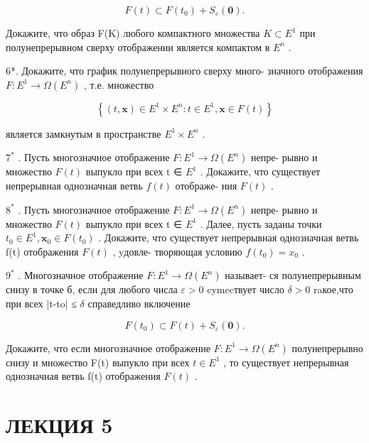 \documentclass[8pt]{extarticle}
\begin{document}
\[
F\left( t\right)  \subset  F\left( {t}_{0}\right)  + {S}_{\varepsilon }\left( \mathbf{0}\right) .
\]

Докажите, что образ F(K) любого компактного множества \(K \subset  {E}^{1}\) при полунепрерывном сверху отображении является компактом в \({E}^{n}\) .

6*. Докажите, что график полунепрерывного сверху много- значного отображения \(F : {E}^{1} \rightarrow  \Omega \left( {E}^{n}\right)\) , т.е. множество

\[
\left\{  {\left( {t,\mathbf{x}}\right)  \in  {E}^{1} \times  {E}^{n} : t \in  {E}^{1},\mathbf{x} \in  F\left( t\right) }\right\}
\]

является замкнутым в пространстве \({E}^{1} \times  {E}^{n}\) .

\({7}^{ * }\) . Пусть многозначное отображение \(F : {E}^{1} \rightarrow  \Omega \left( {E}^{n}\right)\) непре- рывно и множество \(F\left( t\right)\) выпукло при всех t ∈ \({E}^{1}\) . Докажите, что существует непрерывная однозначная ветвь \(f\left( t\right)\) отображе- ния \(F\left( t\right)\) .

\({8}^{ * }\) . Пусть многозначное отображение \(F : {E}^{1} \rightarrow  \Omega \left( {E}^{n}\right)\) непре- рывно и множество \(F\left( t\right)\) выпукло при всех t ∈ \({E}^{1}\) . Далее, пусть заданы точки \({t}_{0} \in  {E}^{1},{\mathbf{x}}_{0} \in  F\left( {t}_{0}\right)\) . Докажите, что существует непрерывная однозначная ветвь f(t) отображения \(F\left( t\right)\) , yдовле- творяющая условию \(f\left( {t}_{0}\right)  = {x}_{0}\) .

\({9}^{ * }\) . Многозначное отображение \(F : {E}^{1} \rightarrow  \Omega \left( {E}^{n}\right)\) называет- ся полунепрерывным снизу в точке б, если для любого числа \(\varepsilon  > 0\) cymecтвует число \(\delta  > 0\) raкое,что при всех |t-to| ≤ \(\delta\) справедливо включение

\[
F\left( {t}_{0}\right)  \subset  F\left( t\right)  + {S}_{\varepsilon }\left( \mathbf{0}\right) .
\]

Докажите, что если многозначное отображение \(F : {E}^{1} \rightarrow  \Omega \left( {E}^{n}\right)\) полунепрерывно снизу и множество F(t) выпукло при всех \(t \in  {E}^{1}\) , то существует непрерывная однозначная ветвь f(t) отображения \(F\left( t\right)\) .

\section*{ЛЕКЦИЯ 5}
\end{document}
